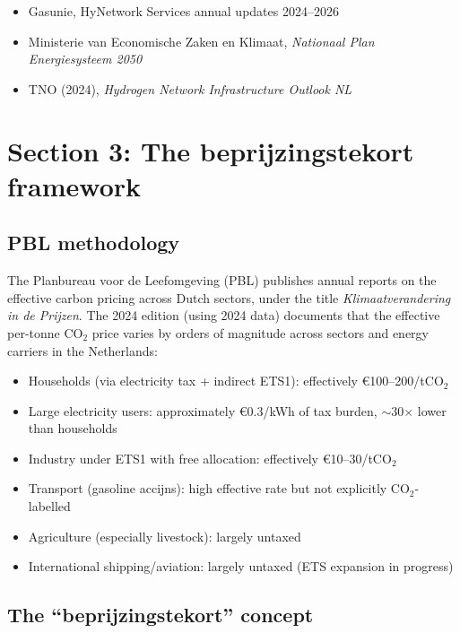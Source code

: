 \documentclass[11pt,a4paper]{article}
\begin{document}
\begin{keysources}
\begin{itemize}
  \item Gasunie, HyNetwork Services annual updates 2024--2026
  \item Ministerie van Economische Zaken en Klimaat, \emph{Nationaal Plan Energiesysteem 2050}
  \item TNO (2024), \emph{Hydrogen Network Infrastructure Outlook NL}
\end{itemize}
\end{keysources}

\newpage

\section{Section 3: The beprijzingstekort framework}

\subsection{PBL methodology}

The Planbureau voor de Leefomgeving (PBL) publishes annual reports on the effective carbon pricing across Dutch sectors, under the title \emph{Klimaatverandering in de Prijzen}. The 2024 edition (using 2024 data) documents that the effective per-tonne CO$_2$ price varies by orders of magnitude across sectors and energy carriers in the Netherlands:

\begin{itemize}
  \item Households (via electricity tax + indirect ETS1): effectively \euro 100--200/tCO$_2$
  \item Large electricity users: approximately \euro 0.3/kWh of tax burden, $\sim$30$\times$ lower than households
  \item Industry under ETS1 with free allocation: effectively \euro 10--30/tCO$_2$
  \item Transport (gasoline accijns): high effective rate but not explicitly CO$_2$-labelled
  \item Agriculture (especially livestock): largely untaxed
  \item International shipping/aviation: largely untaxed (ETS expansion in progress)
\end{itemize}

\subsection{The ``beprijzingstekort'' concept}
\end{document}
